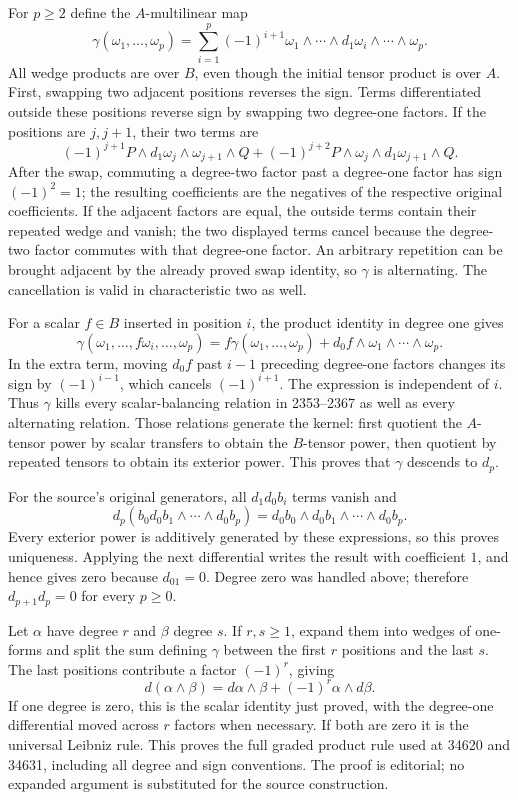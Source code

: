 For \(p\ge2\) define the \(A\)-multilinear map \[
\gamma(\omega_1,\ldots,\omega_p)
=\sum_{i=1}^p(-1)^{i+1}\omega_1\wedge\cdots\wedge d_1\omega_i\wedge\cdots\wedge\omega_p.
\] All wedge products are over \(B\), even though the initial tensor product is over \(A\). First, swapping two adjacent positions reverses the sign. Terms differentiated outside these positions reverse sign by swapping two degree-one factors. If the positions are \(j,j+1\), their two terms are \[
(-1)^{j+1}P\wedge d_1\omega_j\wedge\omega_{j+1}\wedge Q
+(-1)^{j+2}P\wedge\omega_j\wedge d_1\omega_{j+1}\wedge Q.
\] After the swap, commuting a degree-two factor past a degree-one factor has sign \((-1)^2=1\); the resulting coefficients are the negatives of the respective original coefficients. If the adjacent factors are equal, the outside terms contain their repeated wedge and vanish; the two displayed terms cancel because the degree-two factor commutes with that degree-one factor. An arbitrary repetition can be brought adjacent by the already proved swap identity, so \(\gamma\) is alternating. The cancellation is valid in characteristic two as well.

For a scalar \(f\in B\) inserted in position \(i\), the product identity in degree one gives \[
\gamma(\omega_1,\ldots,f\omega_i,\ldots,\omega_p)
=f\gamma(\omega_1,\ldots,\omega_p)
+d_0f\wedge\omega_1\wedge\cdots\wedge\omega_p.
\] In the extra term, moving \(d_0f\) past \(i-1\) preceding degree-one factors changes its sign by \((-1)^{i-1}\), which cancels \((-1)^{i+1}\). The expression is independent of \(i\). Thus \(\gamma\) kills every scalar-balancing relation in 2353--2367 as well as every alternating relation. Those relations generate the kernel: first quotient the \(A\)-tensor power by scalar transfers to obtain the \(B\)-tensor power, then quotient by repeated tensors to obtain its exterior power. This proves that \(\gamma\) descends to \(d_p\).

For the source's original generators, all \(d_1d_0b_i\) terms vanish and \[
d_p(b_0d_0b_1\wedge\cdots\wedge d_0b_p)
=d_0b_0\wedge d_0b_1\wedge\cdots\wedge d_0b_p.
\] Every exterior power is additively generated by these expressions, so this proves uniqueness. Applying the next differential writes the result with coefficient \(1\), and hence gives zero because \(d_01=0\). Degree zero was handled above; therefore \(d_{p+1}d_p=0\) for every \(p\ge0\).

Let \(\alpha\) have degree \(r\) and \(\beta\) degree \(s\). If \(r,s\ge1\), expand them into wedges of one-forms and split the sum defining \(\gamma\) between the first \(r\) positions and the last \(s\). The last positions contribute a factor \((-1)^r\), giving \[
d(\alpha\wedge\beta)=d\alpha\wedge\beta+(-1)^r\alpha\wedge d\beta.
\] If one degree is zero, this is the scalar identity just proved, with the degree-one differential moved across \(r\) factors when necessary. If both are zero it is the universal Leibniz rule. This proves the full graded product rule used at 34620 and 34631, including all degree and sign conventions. The proof is editorial; no expanded argument is substituted for the source construction.

